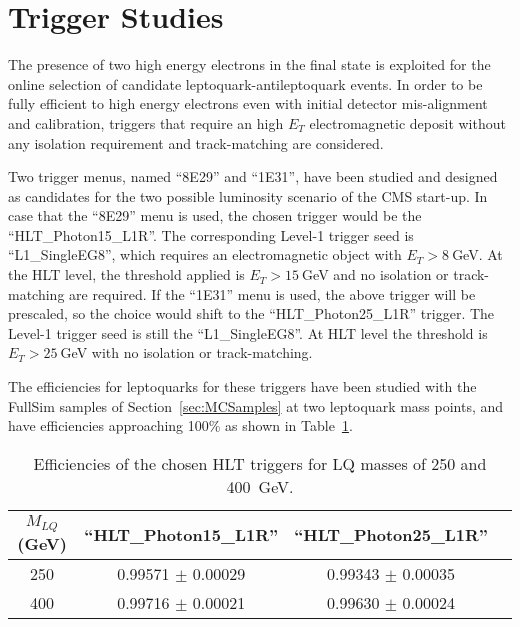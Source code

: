 %
\section{Trigger Studies} \label{sec:trig}

The presence of two high energy electrons in the final state is exploited for the online selection 
of candidate leptoquark-antileptoquark events.
In order to be fully efficient to high energy electrons even with initial detector mis-alignment 
and calibration, triggers that require an high $E_T$ electromagnetic deposit without any isolation 
requirement and track-matching are considered.

Two trigger menus, named ``8E29'' and ``1E31'', have been studied and designed as candidates for 
the two possible luminosity scenario of the CMS start-up.
In case that the ``8E29'' menu is used, the chosen trigger would be the ``HLT\_Photon15\_L1R''.
The corresponding Level-1 trigger seed is ``L1\_SingleEG8'', which requires an electromagnetic object with 
$E_T>8~$GeV. At the HLT level, the threshold applied is $E_T>15~$GeV and no isolation or track-matching
are required.
If the ``1E31'' menu is used, the above trigger will be prescaled, so the choice would shift to the
``HLT\_Photon25\_L1R'' trigger. The Level-1 trigger seed is still the ``L1\_SingleEG8''. At HLT level the 
threshold is $E_T>25~$GeV with no isolation or track-matching.

The efficiencies for leptoquarks for these triggers have been studied with the FullSim 
samples of Section~\ref{sec:MCSamples} at two leptoquark mass points, and have efficiencies approaching
100\% as shown in Table~\ref{tab:HLTEffic}.

\begin{table}[htbp]
\begin{center}
\begin{tabular}{|c|c|c|c|}
\hline\hline
 $M_{LQ}$ (GeV)     &   ``HLT\_Photon15\_L1R''   &   ``HLT\_Photon25\_L1R'' \\
\hline\hline
250                 & 0.99571  $\pm$ 0.00029     & 0.99343  $\pm$ 0.00035   \\
400                 & 0.99716  $\pm$ 0.00021     & 0.99630  $\pm$ 0.00024   \\
\hline\hline
\end{tabular}
\end{center}
\caption{Efficiencies of the chosen HLT triggers for LQ masses of 250 and 400~GeV.}
\label{tab:HLTEffic}
\end{table}






%

